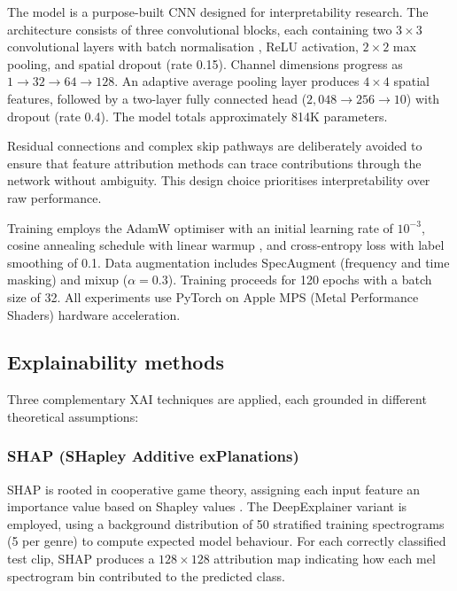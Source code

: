 \documentclass{article}
\begin{document}
The model is a purpose-built CNN designed for interpretability research. The architecture consists of three convolutional blocks, each containing two $3 \times 3$ convolutional layers with batch normalisation \cite{Ioffe2015}, ReLU activation, $2 \times 2$ max pooling, and spatial dropout (rate 0.15). Channel dimensions progress as $1 \rightarrow 32 \rightarrow 64 \rightarrow 128$. An adaptive average pooling layer produces $4 \times 4$ spatial features, followed by a two-layer fully connected head ($2{,}048 \rightarrow 256 \rightarrow 10$) with dropout (rate 0.4). The model totals approximately 814K parameters.

Residual connections and complex skip pathways are deliberately avoided to ensure that feature attribution methods can trace contributions through the network without ambiguity. This design choice prioritises interpretability over raw performance.

Training employs the AdamW optimiser \cite{Kingma2015} with an initial learning rate of $10^{-3}$, cosine annealing schedule with linear warmup \cite{Loshchilov2017}, and cross-entropy loss with label smoothing of 0.1. Data augmentation includes SpecAugment \cite{Park2019} (frequency and time masking) and mixup \cite{Zhang2018} ($\alpha = 0.3$). Training proceeds for 120 epochs with a batch size of 32. All experiments use PyTorch \cite{Paszke2019} on Apple MPS (Metal Performance Shaders) hardware acceleration.

\subsection{Explainability methods}\label{subsec:xai_methods}

Three complementary XAI techniques are applied, each grounded in different theoretical assumptions:

\subsubsection{SHAP (SHapley Additive exPlanations)}

SHAP \cite{Lundberg2017} is rooted in cooperative game theory, assigning each input feature an importance value based on Shapley values \cite{Shapley1953}. The DeepExplainer variant is employed, using a background distribution of 50 stratified training spectrograms (5 per genre) to compute expected model behaviour. For each correctly classified test clip, SHAP produces a $128 \times 128$ attribution map indicating how each mel spectrogram bin contributed to the predicted class.
\end{document}
